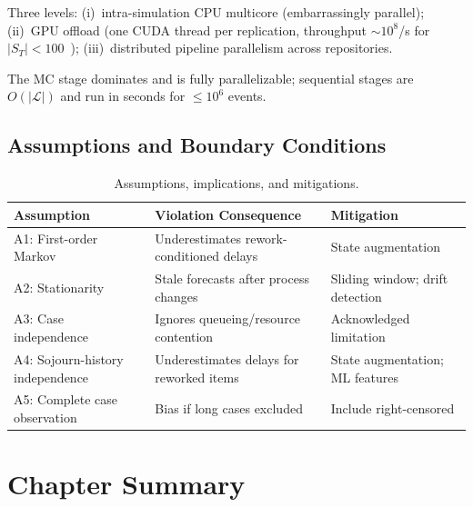 Three levels: (i)~intra-simulation CPU multicore (embarrassingly
parallel); (ii)~GPU offload (one CUDA thread per replication, throughput
$\sim 10^8$/s for $|S_T| < 100$~\cite{lecuyer2017random});
(iii)~distributed pipeline parallelism across repositories.

\begin{remark}
\label{rem:scalability}
The MC stage dominates and is fully parallelizable; sequential stages are
$O(|\mathcal{L}|)$ and run in seconds for $\leq 10^6$ events.
\end{remark}


\subsection{Assumptions and Boundary Conditions}
\label{sec:assumptions}

\begin{table}[htbp]
\centering
\caption{Assumptions, implications, and mitigations.}
\label{tab:assumptions}
\small
\begin{tabular}{p{3.5cm}p{4cm}p{4cm}}
\toprule
\textbf{Assumption} & \textbf{Violation Consequence} & \textbf{Mitigation} \\
\midrule
A1: First-order Markov         & Underestimates rework-conditioned delays   & State augmentation \\
\midrule
A2: Stationarity                & Stale forecasts after process changes      & Sliding window; drift detection \\
\midrule
A3: Case independence           & Ignores queueing/resource contention       & Acknowledged limitation \\
\midrule
A4: Sojourn-history independence & Underestimates delays for reworked items  & State augmentation; ML features \\
\midrule
A5: Complete case observation   & Bias if long cases excluded                & Include right-censored \\
\bottomrule
\end{tabular}
\end{table}


\section{Chapter Summary}
\label{sec:method-summary}

